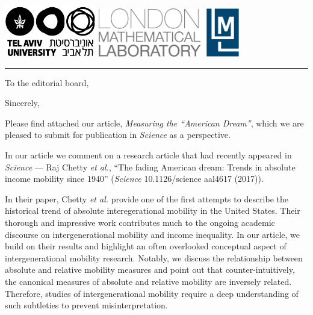 \documentclass[12pt,letter,sans]{moderncv} %
\begin{document}
\noindent
\begin{flushleft}
\includegraphics[width=0.3\textwidth] {./tau1.jpg}
\hspace{97pt}
\includegraphics[width=0.463\textwidth] {./lml_LOGO_whiteBG.jpg}
\\ \vspace{-7pt}
\rule{160mm}{1.5pt}
\end{flushleft}


\vspace{3mm}

\date{\today}
\opening{To the editorial board,}
\closing{Sincerely,}
\makelettertitle

Please find attached our article, \emph{Measuring the ``American Dream''}, which we are pleased to submit for publication in \emph{Science} as a perspective.

In our article we comment on a research article that had recently appeared in \emph{Science} --- Raj Chetty \emph{et al.}, ``The fading American dream: Trends in absolute income mobility since 1940'' (\emph{Science} 10.1126/science aal4617 (2017)).

In their paper, Chetty \emph{et al.} provide one of the first attempts to describe the historical trend of absolute interegerational mobility in the United States. Their thorough and impressive work contributes much to the ongoing academic discourse on intergenerational mobility and income inequality. In our article, we build on their results and highlight an often overlooked conceptual aspect of intergenerational mobility research. Notably, we discuss the relationship between absolute and relative mobility measures and point out that counter-intuitively, the canonical measures of absolute and relative mobility are inversely related. Therefore, studies of intergenerational mobility require a deep understanding of such subtleties to prevent misinterpretation.
\end{document}
